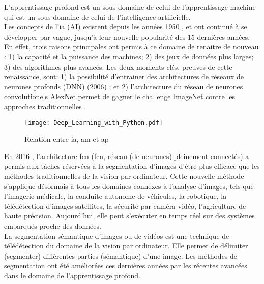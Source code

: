 ﻿\noindent L’apprentissage profond est un sous-domaine de celui de l'apprentissage machine qui est un sous-domaine de celui de l'intelligence artificielle. 
\vspace{\baselineskip}
\\
\noindent Les concepts de l'\lowercase{\acrlong{ia}} (AI) existent depuis les années 1950 \parencite{chollet_deep_2018, alom_history_2018}, et ont continué à se développer par vague, jusqu'à leur nouvelle popularité des 15 dernières années. En effet, trois raisons principales ont permis à ce domaine de renaitre de nouveau \parencite[p.~20]{chollet_deep_2018}: 1) la capacité et la puissance des machines; 2) des jeux de données plus larges; 3) des algorithmes plus avancés. Les deux moments clés, preuves de cette renaissance, sont: 1) la possibilité d'entrainer des architectures de réseaux de neurones profonds (DNN) (2006) \parencite[p.~6]{alom_history_2018}; et 2) l'architecture du réseau de neurones convolutionels AlexNet permet de gagner le challenge ImageNet contre les approches traditionnelles \parencite[p.~11]{alom_history_2018}. 
\begin{figure}[H]
   \centering
   \texttt{[image: Deep\_Learning\_with\_Python.pdf]}
   \caption[Relation entre \acrlong{ia}, \acrlong{am} et \acrlong{ap}]{Relation entre \acrlong{ia}, \acrlong{am} et \acrlong{ap} \parencite[p.~4]{chollet_deep_2018}}
   \label{fig:ia_ml_ap}
\end{figure}
\noindent En 2016 \parencite[p.~14]{alom_history_2018}, l'architecture \acrshort{fcn} (\acrlong{fcn}, réseau (de neurones) pleinement connectés) a permis aux tâches réservées à la segmentation d'images d'être plus efficace que les méthodes traditionnelles de la vision par ordinateur. Cette nouvelle méthode s'applique désormais à tous les domaines connexes à l'analyse d'images, tels que l'imagerie médicale, la conduite autonome de véhicules, la robotique, la télédétection d'images satellites, la sécurité par caméra vidéo, l'agriculture de haute précision. Aujourd'hui, elle peut s'exécuter en temps réel sur des systèmes embarqués proche des données. 
\vspace{\baselineskip}
\\
\noindent La segmentation sémantique d'images ou de vidéos est une technique de télédétection du domaine de la vision par ordinateur. Elle permet de délimiter (segmenter) différentes parties (sémantique) d'une image. Les méthodes de segmentation ont été améliorées ces dernières années par les récentes avancées dans le domaine de l'apprentissage profond. 

